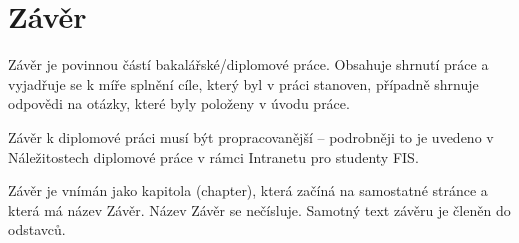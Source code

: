 \chapter*{Závěr}

Závěr je povinnou částí bakalářské/diplomové práce. Obsahuje shrnutí práce a vyjadřuje se k míře splnění cíle, který byl v práci stanoven, případně shrnuje odpovědi na otázky, které byly položeny v úvodu práce. 

Závěr k diplomové práci musí být propracovanější -- podrobněji to je uvedeno v Náležitostech diplomové práce v rámci Intranetu pro studenty FIS.

Závěr je vnímán jako kapitola (chapter), která začíná na samostatné stránce a která má název Závěr.  Název Závěr se nečísluje. Samotný text závěru je členěn do odstavců.